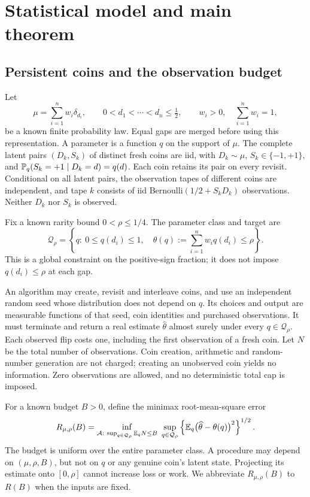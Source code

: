\section{Statistical model and main theorem}\label{sec:model}

\subsection{Persistent coins and the observation budget}
Let
\[
 \mu=\sum_{i=1}^n w_i\delta_{d_i},\qquad
 0<d_1<\cdots<d_n\le\tfrac12,\qquad
 w_i>0,\quad\sum_{i=1}^n w_i=1,
\]
be a known finite probability law. Equal gaps are merged before using
this representation. A parameter is a function $q$ on the support of
$\mu$. The complete latent pairs $(D_k,S_k)$ of distinct fresh coins
are iid, with $D_k\sim\mu$, $S_k\in\{-1,+1\}$, and
$\mathbb P_q(S_k=+1\mid D_k=d)=q(d)$. Each coin retains its pair on every
revisit. Conditional on all latent pairs, the observation tapes of
different coins are independent, and tape $k$ consists of iid
Bernoulli$(1/2+S_kD_k)$ observations. Neither $D_k$ nor $S_k$ is observed.

Fix a known rarity bound $0<\rho\le1/4$. The parameter class and target are
\begin{equation}\label{eq:parameter-class}
 \mathcal Q_\rho=\left\{q:\ 0\le q(d_i)\le1,\quad
       \theta(q):=\sum_{i=1}^n w_iq(d_i)\le\rho\right\}.
\end{equation}
This is a global constraint on the positive-sign fraction; it does not
impose $q(d_i)\le\rho$ at each gap.

An algorithm may create, revisit and interleave coins, and use an
independent random seed whose distribution does not depend on $q$.
Its choices and output are measurable functions of that seed, coin
identities and purchased observations. It must terminate and return
a real estimate $\widehat\theta$ almost surely under every
$q\in\mathcal Q_\rho$. Each observed flip costs one, including the
first observation of a fresh coin. Let $N$ be the total number of
observations. Coin creation, arithmetic and random-number generation
are not charged; creating an unobserved coin yields no information.
Zero observations are allowed, and no deterministic total cap is imposed.

For a known budget $B>0$, define the minimax root-mean-square error
\begin{equation}\label{eq:minimax-risk}
 R_{\mu,\rho}(B)=
 \inf_{\mathcal A:\ \sup_{q\in\mathcal Q_\rho}\mathbb E_qN\le B}
 \ \sup_{q\in\mathcal Q_\rho}
       \left\{\mathbb E_q\bigl(\widehat\theta-\theta(q)\bigr)^2\right\}^{1/2}.
\end{equation}
The budget is uniform over the entire parameter class. A procedure may
depend on $(\mu,\rho,B)$, but not on $q$ or any genuine coin's latent
state. Projecting its estimate onto $[0,\rho]$ cannot increase loss
or work. We abbreviate $R_{\mu,\rho}(B)$ to $R(B)$ when the inputs
are fixed.

